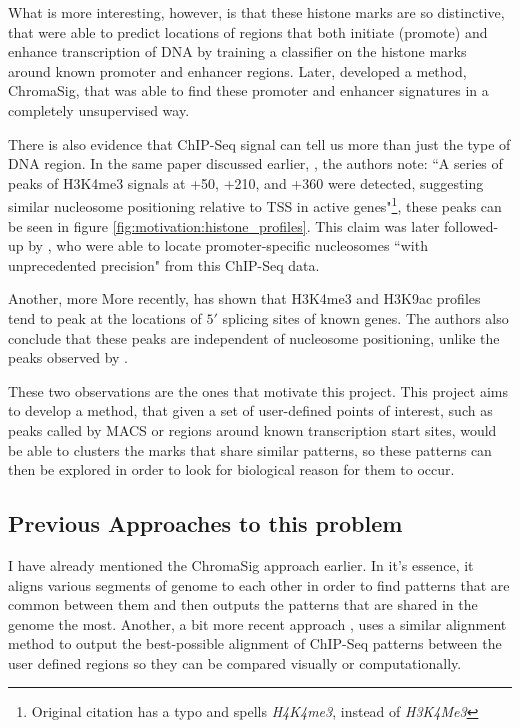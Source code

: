 \documentclass[parskip]{cs4rep}
\newcommand{\histonemodification}[1]{#1}
\begin{document}
What is more interesting, however, is that these histone marks are so distinctive, that 
\cite{Heintzman:2007ke} were able to predict locations of regions that both initiate (promote) and enhance transcription of DNA by training a classifier on the histone marks around known promoter and enhancer regions. Later, \cite{Hon:2008wv} developed a method, ChromaSig, that was able to find these promoter and enhancer signatures in a completely unsupervised way.

There is also evidence that ChIP-Seq signal can tell us more than just the type of DNA region. In the same paper discussed earlier, \cite{Barski:2007ww}, the authors note: ``A series of peaks of H3K4me3 signals at +50, +210, and +360 were detected, suggesting similar nucleosome positioning relative to TSS in active genes"\footnote{Original citation has a typo and spells \emph{H4K4me3}, instead of \emph{H3K4Me3}}, these peaks can be seen in figure \autoref{fig:motivation:histone_profiles}. 
This claim was later followed-up by \cite{Schmid:2007ue}, who were able to locate promoter-specific nucleosomes ``with unprecedented precision" from this ChIP-Seq data. 

Another, more More recently, \cite{Bieberstein:2012tf} has shown that \histonemodification{H3K4me3} and \histonemodification{H3K9ac} profiles tend to peak at the locations of $5'$ splicing sites of known genes. The authors also conclude that these peaks are independent of nucleosome positioning, unlike the peaks observed by \cite{Barski:2007ww}.

These two observations are the ones that motivate this project. This project aims to develop a method, that given a set of user-defined points of interest, such as peaks called by MACS or regions around known transcription start sites, would be able to clusters the marks that share similar patterns, so these patterns can then be explored in order to look for biological reason for them to occur.

\subsection{Previous Approaches to this problem}

I have already mentioned the ChromaSig\cite{Hon:2008wv} approach earlier. In it's essence, it aligns various segments of genome to each other in order to find patterns that are common between them and then outputs the patterns that are shared in the genome the most. Another, a bit more recent approach \cite{Lai:2010ue}, uses a similar alignment method to output the best-possible alignment of ChIP-Seq patterns between the user defined regions so they can be compared visually or computationally.
\end{document}
